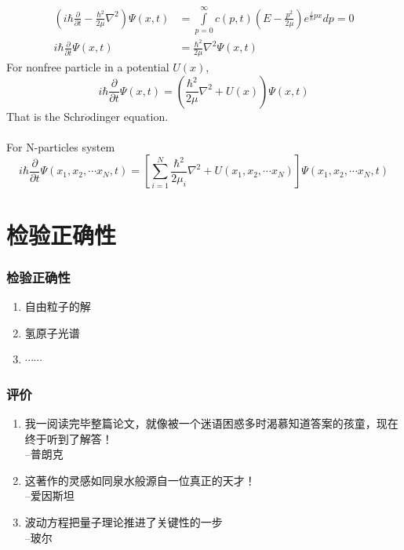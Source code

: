 \begin{frame} [allowframebreaks=]
\begin{equation*}
        \begin{split}
        (i\hbar \frac{\partial }{\partial t} - \frac{\hbar^2}{2\mu} \nabla^2 )\Psi(x,t) &= \int\limits_{p=0} ^{\infty} c(p,t) (E-\frac{p^2}{2\mu}) e^{\frac{i}{\hbar}px}dp=0  \\
        i\hbar \frac{\partial }{\partial t} \Psi(x,t) &= \frac{\hbar^2}{2\mu} \nabla^2 \Psi(x,t)
        \end{split}
    \end{equation*}
    For nonfree particle in a potential $U(x)$,
    \begin{equation*}
        i\hbar \frac{\partial }{\partial t} \Psi(x,t) = (\frac{\hbar^2}{2\mu} \nabla^2 +U(x)) \Psi(x,t)
    \end{equation*}
    That is the Schr$\ddot{o}$dinger equation. \\
    ~~\\
    \bullet For N-particles system
   {\small \begin{equation*}
        i\hbar \frac{\partial }{\partial t} \Psi(x_1, x_2, \cdots x_N,t) = [\sum_{i=1} ^{N} \frac{\hbar ^2}{2\mu_i} \nabla^2 +U(x_1, x_2, \cdots x_N)] \Psi(x_1, x_2, \cdots x_N,t)
    \end{equation*}}
\end{frame}

\section{检验正确性}

\begin{frame}
    \frametitle{检验正确性}
    \begin{enumerate}
        \item 自由粒子的解
        \item 氢原子光谱
        \item $\cdots \cdots$
    \end{enumerate}
\end{frame}

\begin{frame}
    \frametitle{评价}
    \begin{enumerate}
        \item 我一阅读完毕整篇论文，就像被一个迷语困惑多时渴慕知道答案的孩童，现在终于听到了解答！\\
        \hspace{5cm} --普朗克
        \item 这著作的灵感如同泉水般源自一位真正的天才！\\
        \hspace{5cm} --爱因斯坦
        \item  波动方程把量子理论推进了关键性的一步\\
        \hspace{5cm} --玻尔
    \end{enumerate}
\end{frame}

